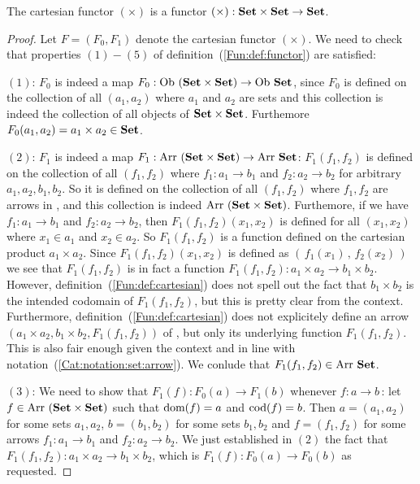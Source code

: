 \begin{prop}\label{Fun:prop:cartesian}
    The cartesian functor $(\times)$ is a functor $(\times):\mbox{\bf Set}\times\mbox{\bf Set}
    \to\mbox{\bf Set}$. 
\end{prop}
\begin{proof}
    Let $F=(F_{0},F_{1})$ denote the cartesian functor $(\times)$. We need
    to check that properties $(1)-(5)$ of definition~(\ref{Fun:def:functor}) 
    are satisfied:

    $(1)$: $F_{0}$ is indeed a map $F_{0}:\ob\ (\Set\times\Set)\to\ob\ \Set$, 
    since $F_{0}$ is defined on the collection of all $(a_{1},a_{2})$ where
    $a_{1}$ and $a_{2}$ are sets and this collection is indeed the collection
    of all objects of $\mbox{\bf Set}\times\mbox{\bf Set}$. Furthemore $F_{0}(a_{1},a_{2})=
    a_{1}\times a_{2}\in\mbox{\bf Set}$.

    $(2)$: $F_{1}$ is indeed a map $F_{1}:\arr\ (\Set\times\Set)\to\arr\ \Set$:
    $F_{1}(f_{1},f_{2})$ is defined on the collection of all $(f_{1},f_{2})$
    where $f_{1}:a_{1}\to b_{1}$ and $f_{2}:a_{2}\to b_{2}$ for arbitrary
    $a_{1}, a_{2}, b_{1}, b_{2}$. So it is defined on the collection of all
    $(f_{1},f_{2})$ where $f_{1},f_{2}$ are arrows in \Set, and this collection
    is indeed $\mbox{\rm Arr}\ (\mbox{\bf Set}\times\mbox{\bf Set})$. Furthemore, if we have $f_{1}:a_{1}\to 
    b_{1}$ and $f_{2}:a_{2}\to b_{2}$, then $F_{1}(f_{1},f_{2})(x_{1},x_{2})$ is 
    defined for all $(x_{1},x_{2})$ where $x_{1}\in a_{1}$ and $x_{2}\in a_{2}$.
    So $F_{1}(f_{1},f_{2})$ is a function defined on the 
    cartesian product $a_{1}\times a_{2}$. Since $F_{1}(f_{1},f_{2})(x_{1},x_{2})$
    is defined as $(\,f_{1}(x_{1})\,,\,f_{2}(x_{2})\,)$ we see that $F_{1}
    (f_{1},f_{2})$ is in fact a function $F_{1}(f_{1},f_{2}):a_{1}\times a_{2}
    \to b_{1}\times b_{2}$. However, definition~(\ref{Fun:def:cartesian}) does
    not spell out the fact that $b_{1}\times b_{2}$ is the intended codomain
    of $F_{1}(f_{1},f_{2})$, but this is pretty clear from the context.
    Furthermore, definition~(\ref{Fun:def:cartesian}) does not explicitely 
    define an arrow $(a_{1}\times a_{2},b_{1}\times b_{2},F_{1}(f_{1},f_{2}))$ of 
    \Set, but only its underlying function $F_{1}(f_{1},f_{2})$. This is also 
    fair enough given the context and in line with 
    notation~(\ref{Cat:notation:set:arrow}). We conlude that $F_{1}(f_{1},f_{2})
    \in\mbox{\rm Arr}\ \mbox{\bf Set}$.

    $(3)$: We need to show that $F_{1}(f):F_{0}(a)\to F_{1}(b)$ whenever
    $f:a\to b$\,: let $f\in\mbox{\rm Arr}\ (\mbox{\bf Set}\times\mbox{\bf Set})$ such that $\mbox{\rm dom}(f)=a$ and
    $\mbox{\rm cod}(f)=b$. Then $a=(a_{1},a_{2})$ for some sets $a_{1},a_{2}$, $b=
    (b_{1},b_{2})$ for some sets $b_{1},b_{2}$ and $f=(f_{1},f_{2})$ for some
    arrows $f_{1}:a_{1}\to b_{1}$ and $f_{2}:a_{2}\to b_{2}$. We just established
    in $(2)$ the fact that $F_{1}(f_{1},f_{2}):a_{1}\times a_{2}\to b_{1}
    \times b_{2}$, which is $F_{1}(f):F_{0}(a)\to F_{0}(b)$ as requested.


\end{proof}
